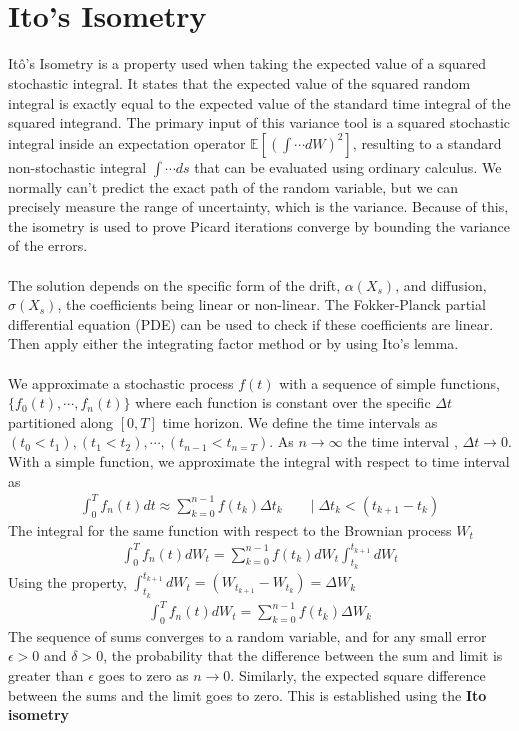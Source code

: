 \\\\
\section{Ito's Isometry}
Itô's Isometry is a property used when taking the expected value of a squared stochastic integral. It states that the expected value of the squared random integral is exactly equal to the expected value of the standard time integral of the squared integrand. The primary input of this variance tool is a squared stochastic integral inside an expectation operator $\mathbb{E}\left[(\int \cdots dW)^2\right]$, resulting to a standard non-stochastic integral $\int \cdots ds$ that can be evaluated using ordinary calculus. We normally can't predict the exact path of the random variable, but we can precisely measure the range of uncertainty, which is the variance. Because of this, the isometry is used to prove Picard iterations converge by bounding the variance of the errors.
\\\\
The solution depends on the specific form of the drift, $\alpha(X_s)$, and diffusion, $\sigma(X_s)$, the coefficients being linear or non-linear. The Fokker-Planck \cite{wiki:fokker-planck} partial differential equation (PDE) can be used to check if these coefficients are linear. Then apply either the integrating factor method or by using Ito's lemma.
\\\\
We approximate a stochastic process $f(t)$ with a sequence of simple functions, $\{f_0(t),\cdots, f_n(t)\}$ where each  function is constant over the specific $\Delta t$ partitioned along $[0, T]$ time horizon. We define the time intervals as $(t_0 < t_1), (t_1< t_2), \cdots,(t_{n-1} < t_{n = T})$. As $n \rightarrow \infty$ the time interval , $\Delta t \rightarrow 0$.
With a simple function, we approximate the integral with respect to time interval as
\begin{align*}
\int_0^T f_n(t)dt \approx \sum_{k=0}^{n-1} f(t_k)\Delta t_k \qquad | \;\Delta t_k < (t_{k+1}-t_k) 
\end{align*}
The integral for the same function with respect to the Brownian process $W_t$
\begin{align*}
\int_0^T f_n(t)dW_t = \sum_{k=0}^{n-1} f(t_k)dW_t \int_{t_k}^{t_{k+1}} dW_t
\end{align*}
Using the property, $\int_{t_k}^{t_{k+1}} dW_t = \left(W_{t_{k+1}} - W_{t_k}\right) = \Delta W_k$ 
\begin{align*}
\int_0^T f_n(t)dW_t = \sum_{k=0}^{n-1} f(t_k)\Delta W_k
\end{align*}
The sequence of sums converges to a random variable, and for any small error $\epsilon > 0$ and $\delta > 0$, the probability that the difference between the sum and limit is greater than $\epsilon$ goes to zero as $n \rightarrow 0$. Similarly, the expected square difference between the sums and the limit goes to zero.
This is established using the \textbf{Ito isometry}

